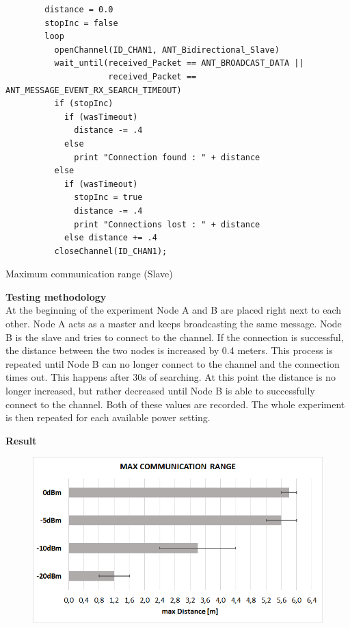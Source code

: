 \begin{description}
	\begin{code}[H]
		\begin{verbatim}
		distance = 0.0
		stopInc = false
		loop 
		  openChannel(ID_CHAN1, ANT_Bidirectional_Slave)
		  wait_until(received_Packet == ANT_BROADCAST_DATA || 
		             received_Packet == ANT_MESSAGE_EVENT_RX_SEARCH_TIMEOUT) 
		  if (stopInc) 
		    if (wasTimeout) 
		      distance -= .4
		    else 
		      print "Connection found : " + distance
		  else
		    if (wasTimeout)  
		      stopInc = true
		      distance -= .4
		      print "Connections lost : " + distance
		    else distance += .4
		  closeChannel(ID_CHAN1);
		\end{verbatim}
		\caption{Maximum communication range (Slave)}\label{lst:sExp6}
	\end{code}
	\item{\textbf{Testing methodology}} \hfill \\ At the beginning of the experiment Node A and B are placed right next to each other. Node A acts as a master and keeps broadcasting the same message. Node B is the slave and tries to connect to the channel. If the connection is successful, the distance between the two nodes is increased by 0.4 meters. This process is repeated until Node B can no longer connect to the channel and the connection times out. This happens after 30s of searching. At this point the distance is no longer increased, but rather decreased until Node B is able to successfully connect to the channel. Both of these values are recorded. The whole experiment is then repeated for each available power setting.	
	\newpage
	\item{\textbf{Result}} \hfill \\ 
	\begin{figure}[H]
		\centering
		\includegraphics[scale=0.5]{content/images/exp6.png}

\end{figure}
\end{description}
